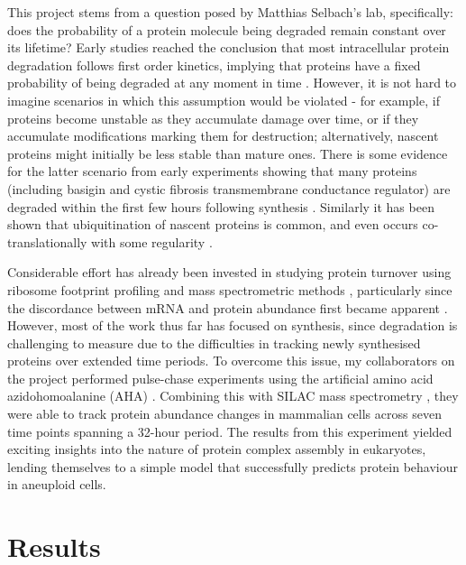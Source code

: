 \documentclass[a4paper,11pt,twoside,openright]{scrbook}
\begin{document}
This project stems from a question posed by Matthias Selbach's lab,
specifically: does the probability of a protein molecule being degraded remain
constant over its lifetime? Early studies reached the conclusion that most
intracellular protein degradation follows first order kinetics, implying that
proteins have a fixed probability of being degraded at any moment in time
\cite{Schimke1970,Goldberg1974}. However, it is not hard to imagine scenarios in
which this assumption would be violated - for example, if proteins become
unstable as they accumulate damage over time, or if they accumulate
modifications marking them for destruction; alternatively, nascent proteins
might initially be less stable than mature ones. There is some evidence for the
latter scenario from early experiments showing that many proteins (including
basigin and cystic fibrosis transmembrane conductance regulator) are degraded
within the first few hours following synthesis
\cite{Wheatley1980,Tyler2012,Ward1994}. Similarly it has been shown that
ubiquitination of nascent proteins is common, and even occurs co-translationally
with some regularity \cite{Kim2011,Wang2013}.

Considerable effort has already been invested in studying protein turnover using
ribosome footprint profiling and mass spectrometric methods
\cite{Ingolia2009,Ingolia2011,Doherty2009,Schwanhausser2011,Kristensen2013},
particularly since the discordance between mRNA and protein abundance first
became apparent \cite{Gygi1999a,Chen2002}. However, most of the work thus far
has focused on synthesis, since degradation is challenging to measure due to the
difficulties in tracking newly synthesised proteins over extended time periods.
To overcome this issue, my collaborators on the project performed pulse-chase
experiments using the artificial amino acid azidohomoalanine (AHA)
\cite{Kiick2002,Dieterich2006}. Combining this with SILAC mass spectrometry
\cite{Ong2002a}, they were able to track protein abundance changes in mammalian
cells across seven time points spanning a 32-hour period. The results from this
experiment yielded exciting insights into the nature of protein complex assembly
in eukaryotes, lending themselves to a simple model that successfully predicts
protein behaviour in aneuploid cells.

\section{Results}
\end{document}
